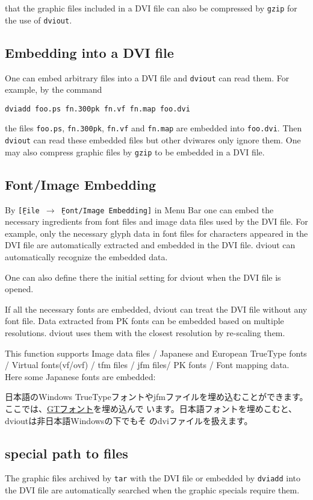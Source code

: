 \documentclass{article}
\begin{document}
 that the graphic files included in a DVI file can also be 
compressed by {\tt gzip} for the use of {\tt dviout}.

\subsection{Embedding into a DVI file}
One can embed arbitrary files into a DVI file and {\tt dviout}
can read them.  For example, by the command
\begin{verbatim}
dviadd foo.ps fn.300pk fn.vf fn.map foo.dvi
\end{verbatim}
the files {\tt foo.ps}, {\tt fn.300pk}, {\tt fn.vf} and {\tt fn.map} are 
embedded into {\tt foo.dvi}.  
Then {\tt dviout} can read these embedded files but other dviwares
only ignore them.
One may also compress graphic files by {\tt gzip} to be embedded
in a DVI file.

\subsection{Font/Image Embedding}
By {\tt [\b{F}ile $\to$ \b{F}ont/Image Embedding]} in Menu Bar one 
can embed the necessary ingredients from font files and image data 
files used by the DVI file. 
For example, only the necessary glyph data in font files for characters 
appeared in the DVI file are automatically extracted and embedded in the 
DVI file.  dviout can automatically recognize the embedded data.  

One can also define there the initial setting for dviout when the DVI 
file is opened. 

If all the necessary fonts are embedded, dviout can treat the DVI file 
without any font file.  Data extracted from PK fonts can be embedded 
based on multiple resolutions.  dviout uses them with the closest 
resolution by re-scaling them.

This function supports Image data files / Japanese and European TrueType 
fonts / Virtual fonts(vf/ovf) / tfm files / jfm files/ PK fonts / 
Font mapping data.  Here some Japanese fonts are embedded:

日本語のWindows TrueTypeフォントやjfmファイルを埋め込むことができます。
ここでは、\href{http://www.l.u-tokyo.ac.jp/GT}{GTフォント}を埋め込んで
います。日本語フォントを埋めこむと、dvioutは非日本語Windowsの下でもそ
のdviファイルを扱えます。

\subsection{special path to files}
The graphic files archived by {\tt tar} with the DVI file or 
embedded by {\tt dviadd} into the DVI file are automatically
searched when the graphic specials require them.
\end{document}
